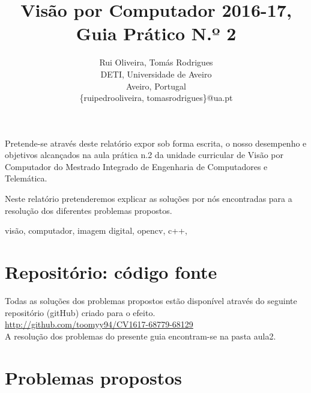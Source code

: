 \documentclass[portuguese, times, mirror]{revdetua}
\begin{document}

\title{Visão por Computador 2016-17, Guia Prático N.º 2}
\author{Rui Oliveira, Tomás Rodrigues\\ DETI, Universidade de Aveiro \\ Aveiro, Portugal \\ \{ruipedrooliveira, tomasrodrigues\}@ua.pt}
\maketitle

\begin{resumo}


Pretende-se através deste relatório expor sob forma escrita, o nosso desempenho e objetivos alcançados na aula prática n.2 da unidade curricular de Visão por Computador do Mestrado Integrado de Engenharia de Computadores e Telemática.

Neste relatório pretenderemos explicar as soluções por nós encontradas para a resolução dos diferentes problemas propostos.


\end{resumo} 

\begin{palavraschave} %
visão, computador, imagem digital, opencv, c++, 
 \end{palavraschave} %




\section{Repositório: código fonte}


Todas as soluções dos problemas propostos estão disponível através do seguinte repositório (gitHub) criado para o efeito. \\

\href{http://github.com/toomyy94/CV1617-68779-68129}{http://github.com/toomyy94/CV1617-68779-68129}
\\


A resolução dos problemas do presente guia encontram-se na pasta aula2. 



\section{Problemas propostos}
\end{document}

